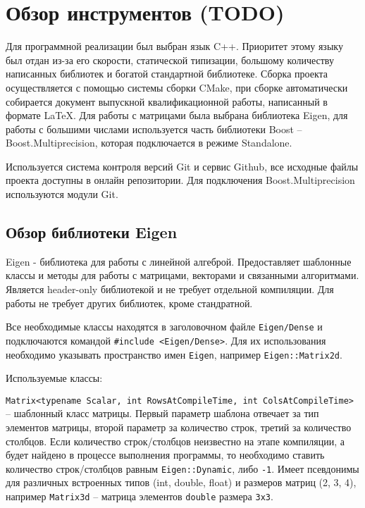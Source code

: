 \newpage

\section{Обзор инструментов (TODO)}

Для программной реализации был выбран язык C++. Приоритет этому языку был отдан из-за его скорости, статической типизации, большому количеству написанных библиотек и богатой стандартной библиотеке. Сборка проекта осуществляется с помощью системы сборки CMake, при сборке автоматически собирается документ выпускной квалификационной работы, написанный в формате \LaTeX. Для работы с матрицами была выбрана библиотека Eigen, для работы с большими числами используется часть библиотеки Boost -- Boost.Multiprecision, которая подключается в режиме Standalone.

Используется система контроля версий Git и сервис Github, все исходные файлы проекта доступны в онлайн репозитории. Для подключения Boost.Multiprecision используются модули Git.

\subsection{Обзор библиотеки Eigen}

Eigen - библиотека для работы с линейной алгеброй. Предоставляет шаблонные классы и методы для работы с матрицами, векторами и связанными алгоритмами. Является header-only библиотекой и не требует отдельной компиляции. Для работы не требует других библиотек, кроме стандратной.

Все необходимые классы находятся в заголовочном файле \verb!Eigen/Dense! и подключаются командой \verb!#include <Eigen/Dense>!. Для их использования необходимо указывать пространство имен \verb!Eigen!, например \verb!Eigen::Matrix2d!.

Используемые классы:

\verb!Matrix<typename Scalar, int RowsAtCompileTime, int ColsAtCompileTime>! -- шаблонный класс матрицы. Первый параметр шаблона отвечает за тип элементов матрицы, второй параметр за количество строк, третий за количество столбцов. Если количество строк/столбцов неизвестно на этапе компиляции, а будет найдено в процессе выполнения программы, то необходимо ставить количество строк/столбцов равным \verb!Eigen::Dynamic!, либо \verb!-1!. Имеет псевдонимы для различных встроенных типов (int, double, float) и размеров матриц (2, 3, 4), например \verb!Matrix3d! -- матрица элементов \verb!double! размера \verb!3x3!. 

